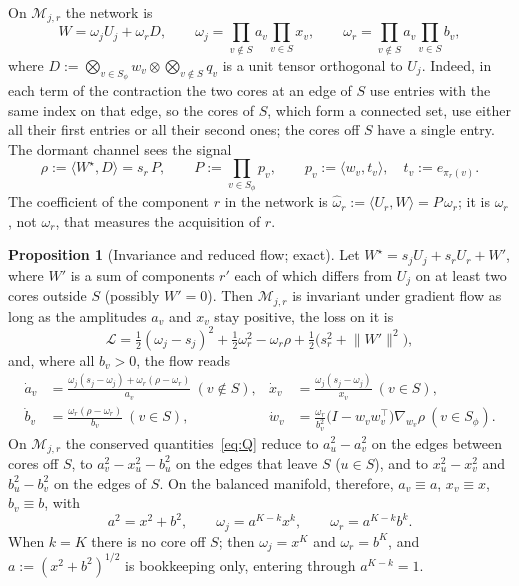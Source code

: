 \documentclass[11pt]{article}
\newcommand{\ip}[2]{\langle #1,#2\rangle}
\newcommand{\norm}[1]{\lVert #1\rVert}
\theoremstyle{definition}
\newtheorem{proposition}[theorem]{Proposition}
\numberwithin{equation}{section}
\begin{document}
On $\mathcal M_{j,r}$ the network is
\begin{equation}\label{eq:W-two-channel}
W=\omega_jU_j+\omega_rD,\qquad\omega_j=\prod_{v\notin S}a_v\prod_{v\in S}x_v,\qquad\omega_r=\prod_{v\notin S}a_v\prod_{v\in S}b_v,
\end{equation}
where $D:=\bigotimes_{v\in S_\phi}w_v\otimes\bigotimes_{v\notin S}q_v$ is a unit tensor orthogonal to $U_j$. Indeed, in each term of the contraction the two cores at an edge of $S$ use entries with the same index on that edge, so the cores of $S$, which form a connected set, use either all their first entries or all their second ones; the cores off $S$ have a single entry. The dormant channel sees the signal
\begin{equation}\label{eq:rho}
\rho:=\ip{W^\star}{D}=s_r\,P,\qquad P:=\prod_{v\in S_\phi}p_v,\qquad p_v:=\ip{w_v}{t_v},\quad t_v:=e_{\pi_r(v)}.
\end{equation}
The coefficient of the component $r$ in the network is $\hat\omega_r:=\ip{U_r}{W}=P\,\omega_r$; it is $\hat\omega_r$, not $\omega_r$, that measures the acquisition of $r$.

\begin{proposition}[Invariance and reduced flow; exact]\label{prop:two-channel}
Let $W^\star=s_jU_j+s_rU_r+W'$, where $W'$ is a sum of components $r'$ each of which differs from $U_j$ on at least two cores outside $S$ (possibly $W'=0$). Then $\mathcal M_{j,r}$ is invariant under gradient flow as long as the amplitudes $a_v$ and $x_v$ stay positive, the loss on it is
\begin{equation}\label{eq:reduced-loss}
\mathcal L=\tfrac12(\omega_j-s_j)^2+\tfrac12\omega_r^2-\omega_r\rho+\tfrac12\big(s_r^2+\norm{W'}^2\big),
\end{equation}
and, where all $b_v>0$, the flow reads
\begin{equation}\label{eq:reduced-flow}
\begin{aligned}
\dot a_v&=\frac{\omega_j(s_j-\omega_j)+\omega_r(\rho-\omega_r)}{a_v}\ (v\notin S),&\dot x_v&=\frac{\omega_j(s_j-\omega_j)}{x_v}\ (v\in S),\\
\dot b_v&=\frac{\omega_r(\rho-\omega_r)}{b_v}\ (v\in S),&\dot w_v&=\frac{\omega_r}{b_v^2}\big(I-w_vw_v^\top\big)\nabla_{w_v}\rho\ (v\in S_\phi).
\end{aligned}
\end{equation}
On $\mathcal M_{j,r}$ the conserved quantities~\eqref{eq:Q} reduce to $a_u^2-a_v^2$ on the edges between cores off $S$, to $a_v^2-x_u^2-b_u^2$ on the edges that leave $S$ ($u\in S$), and to $x_u^2-x_v^2$ and $b_u^2-b_v^2$ on the edges of $S$. On the balanced manifold, therefore, $a_v\equiv a$, $x_v\equiv x$, $b_v\equiv b$, with
\begin{equation}\label{eq:balance}
a^2=x^2+b^2,\qquad\omega_j=a^{K-k}x^k,\qquad\omega_r=a^{K-k}b^k.
\end{equation}
When $k=K$ there is no core off $S$; then $\omega_j=x^K$ and $\omega_r=b^K$, and $a:=(x^2+b^2)^{1/2}$ is bookkeeping only, entering through $a^{K-k}=1$.
\end{proposition}
\end{document}
